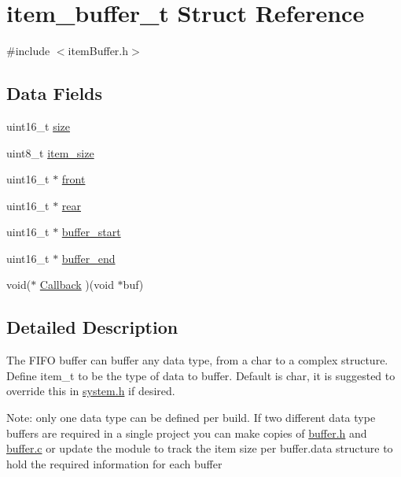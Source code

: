 \hypertarget{structitem__buffer__t}{}\section{item\+\_\+buffer\+\_\+t Struct Reference}
\label{structitem__buffer__t}


{\ttfamily \#include $<$item\+Buffer.\+h$>$}

\subsection*{Data Fields}
\begin{DoxyCompactItemize}
\item 
uint16\+\_\+t \hyperlink{structitem__buffer__t_aaba88b24a21a6c70c895c0d55f4a69a0}{size}
\item 
uint8\+\_\+t \hyperlink{structitem__buffer__t_af7ab82f3973a1053b872fba31f28a456}{item\+\_\+size}
\item 
uint16\+\_\+t $\ast$ \hyperlink{structitem__buffer__t_ab847ad149402d20140c60b31005c35c0}{front}
\item 
uint16\+\_\+t $\ast$ \hyperlink{structitem__buffer__t_aebff95be43c7ec20659e5619ce2b82c9}{rear}
\item 
uint16\+\_\+t $\ast$ \hyperlink{structitem__buffer__t_afac3380a8905f54b8e8bff08d99dad6d}{buffer\+\_\+start}
\item 
uint16\+\_\+t $\ast$ \hyperlink{structitem__buffer__t_aa0fb18c2d69907cc4a924d4081447d24}{buffer\+\_\+end}
\item 
void($\ast$ \hyperlink{structitem__buffer__t_a7957c810329d9c779aad2a456bd77757}{Callback} )(void $\ast$buf)
\end{DoxyCompactItemize}


\subsection{Detailed Description}
The F\+I\+F\+O buffer can buffer any data type, from a char to a complex structure. Define item\+\_\+t to be the type of data to buffer. Default is char, it is suggested to override this in \hyperlink{system_8h}{system.\+h} if desired.

Note\+: only one data type can be defined per build. If two different data type buffers are required in a single project you can make copies of \hyperlink{buffer_8h}{buffer.\+h} and \hyperlink{buffer_8c}{buffer.\+c} or update the module to track the item size per buffer.\+data structure to hold the required information for each buffer 


